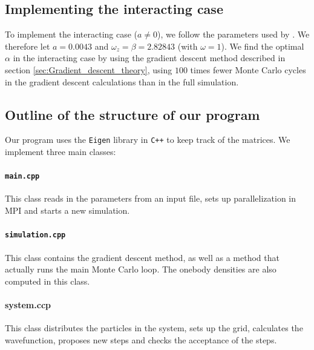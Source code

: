 \documentclass[a4paper, 10pt]{article}
\begin{document}
	\subsection{Implementing the interacting case}
	To implement the interacting case ($a\neq 0$), we follow the parameters used by \cite{Nilsen2005}. We therefore let $a=0.0043$ and $\omega_z=\beta=2.82843$ (with $\omega=1$). We find the optimal $\alpha$ in the interacting case by using the gradient descent method described in section \ref{sec:Gradient_descent_theory}, using $100$ times fewer Monte Carlo cycles in the gradient descent calculations than in the full simulation.
	\subsection{Outline of the structure of our program}
	Our program uses the \texttt{Eigen} library in \texttt{C++} to keep track of the matrices. We implement three main classes:\\
	\paragraph{\texttt{main.cpp}}
	This class reads in the parameters from an input file, sets up parallelization in MPI and starts a new simulation.\\
	\linebreak
	\paragraph{\texttt{simulation.cpp}}
	This class contains the gradient descent method, as well as a method that actually runs the main Monte Carlo loop. The onebody densities are also computed in this class.\\
	\linebreak
	\paragraph{system.ccp}
	This class distributes the particles in the system, sets up the grid, calculates the wavefunction, proposes new steps and checks the acceptance of the steps. 
\end{document}
